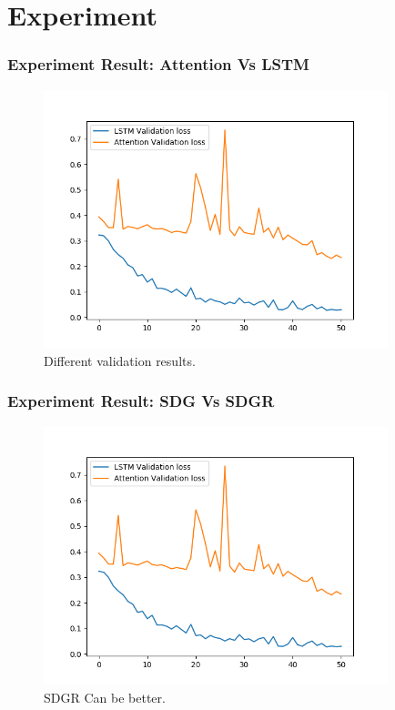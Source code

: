 \documentclass{beamer}
\begin{document}
\section{Experiment} %

\begin{frame}
\frametitle{Experiment Result: Attention Vs LSTM}

	\begin{figure}
		\centering
		\includegraphics[width=10cm]{../Pic/2models.png}
		\caption{Different validation results.}
	\end{figure}
	
\end{frame}

\begin{frame}
\frametitle{Experiment Result: SDG Vs SDGR}

	\begin{figure}
		\centering
		\includegraphics[width=10cm]{../Pic/2models.png}
		\caption{SDGR Can be better.}
	\end{figure}
	

\end{frame}
\end{document}
